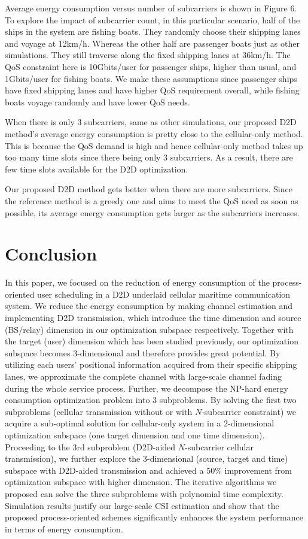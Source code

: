 \documentclass{ieeeaccess}
\begin{document}
Average energy consumption versus number of subcarriers is shown in Figure 6. To explore the impact of subcarrier count, in this particular scenario, half of the ships in the system are fishing boats. They randomly choose their shipping lanes and voyage at 12km/h. Whereas the other half are passenger boats just as other simulations. They still traverse along the fixed shipping lanes at 36km/h. The QoS constraint here is 10Gbits/user for passenger ships, higher than usual, and 1Gbits/user for fishing boats. We make these assumptions since passenger ships have fixed shipping lanes and have higher QoS requirement overall, while fishing boats voyage randomly and have lower QoS needs.

When there is only 3 subcarriers, same as other simulations, our proposed D2D method's average energy consumption is pretty close to the cellular-only method. This is because the QoS demand is high and hence cellular-only method takes up too many time slots since there being only 3 subcarriers. As a result, there are few time slots available for the D2D optimization.

Our proposed D2D method gets better when there are more subcarriers. Since the reference method is a greedy one and aims to meet the QoS need as soon as possible, its average energy consumption gets larger as the subcarriers increases.

\section{Conclusion}\label{sec:4}

In this paper, we focused on the reduction of energy consumption of the process-oriented user scheduling in a D2D underlaid cellular maritime communication system. 
We reduce the energy consumption by making channel estimation and implementing D2D transmission, which introduce the time dimension and source (BS/relay) dimension in our optimization subspace respectively. Together with the target (user) dimension which has been studied previously, our optimization subspace becomes 3-dimensional and therefore provides great potential. 
By utilizing each users' positional information acquired from their specific shipping lanes, we approximate the complete channel with large-scale channel fading during the whole service process. Further, we decompose the NP-hard energy consumption optimization problem into 3 subproblems. By solving the first two subproblems (cellular transmission without or with $N$-subcarrier constraint) we acquire a sub-optimal solution for cellular-only system in a 2-dimensional optimization subspace (one target dimension and one time dimension). Proceeding to the 3rd subproblem (D2D-aided $N$-subcarrier cellular transmission), we further explore the 3-dimensional (source, target and time) subspace with D2D-aided transmission and achieved a 50\% improvement from optimization subspace with higher dimension. The iterative algorithms we proposed can solve the three subproblems with polynomial time complexity. Simulation results justify our large-scale CSI estimation and show that the proposed process-oriented schemes significantly enhances the system performance in terms of energy consumption.
\end{document}
